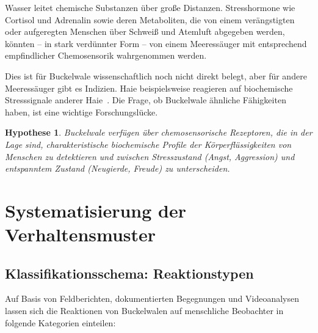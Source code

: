 ﻿\documentclass[12pt,a4paper]{article}
\newtheorem{hypothese}{Hypothese}[section]
\theoremstyle{definition}
\theoremstyle{remark}
\begin{document}
Wasser leitet chemische Substanzen über große Distanzen. Stresshormone wie
Cortisol und Adrenalin sowie deren Metaboliten, die von einem verängstigten
oder aufgeregten Menschen über Schweiß und Atemluft abgegeben werden, könnten
-- in stark verdünnter Form -- von einem Meeressäuger mit entsprechend empfindlicher
Chemosensorik wahrgenommen werden.

Dies ist für Buckelwale wissenschaftlich noch nicht direkt belegt, aber für
andere Meeressäuger gibt es Indizien. Haie beispielsweise reagieren auf
biochemische Stresssignale anderer Haie~\cite{smith1992alarm}. Die Frage,
ob Buckelwale ähnliche Fähigkeiten haben, ist eine wichtige Forschungslücke.

\begin{hypothese}
  \label{hyp:chemo}
  Buckelwale verfügen über chemosensorische Rezeptoren, die in der Lage sind,
  charakteristische biochemische Profile der Körperflüssigkeiten von Menschen
  zu detektieren und zwischen Stresszustand (Angst, Aggression) und
  entspanntem Zustand (Neugierde, Freude) zu unterscheiden.
\end{hypothese}

\section{Systematisierung der Verhaltensmuster}
\label{sec:verhalten}

\subsection{Klassifikationsschema: Reaktionstypen}

Auf Basis von Feldberichten, dokumentierten Begegnungen und Videoanalysen
lassen sich die Reaktionen von Buckelwalen auf menschliche Beobachter in
folgende Kategorien einteilen:
\end{document}
